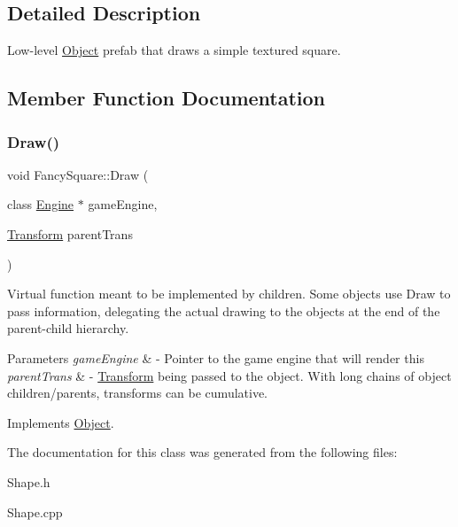 \subsection{Detailed Description}
Low-\/level \hyperlink{class_object}{Object} prefab that draws a simple textured square. 

\subsection{Member Function Documentation}
\hypertarget{class_fancy_square_ac77d35ba8ab766f8a3e35f68e7344953}{}\label{class_fancy_square_ac77d35ba8ab766f8a3e35f68e7344953} 
\subsubsection{\texorpdfstring{Draw()}{Draw()}}
{\footnotesize\ttfamily void Fancy\+Square\+::\+Draw (\begin{DoxyParamCaption}\item[{class \hyperlink{class_engine}{Engine} $\ast$}]{game\+Engine,  }\item[{\hyperlink{class_transform}{Transform}}]{parent\+Trans }\end{DoxyParamCaption})\hspace{0.3cm}{\ttfamily [virtual]}}



Virtual function meant to be implemented by children. Some objects use Draw to pass information, delegating the actual drawing to the objects at the end of the parent-\/child hierarchy. 


\begin{DoxyParams}{Parameters}
{\em game\+Engine} & -\/ Pointer to the game engine that will render this \\
\hline
{\em parent\+Trans} & -\/ \hyperlink{class_transform}{Transform} being passed to the object. With long chains of object children/parents, transforms can be cumulative. \\
\hline
\end{DoxyParams}


Implements \hyperlink{class_object_adeb7a19aaca51dbf093b37fd21c5e41f}{Object}.



The documentation for this class was generated from the following files\+:\begin{DoxyCompactItemize}
\item 
Shape.\+h\item 
Shape.\+cpp\end{DoxyCompactItemize}
